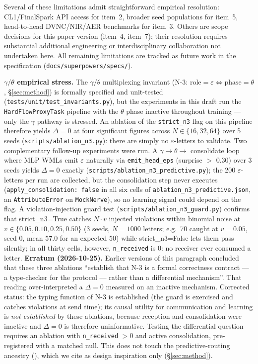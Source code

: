 \documentclass[10pt,twocolumn]{article}
\begin{document}
Several of these limitations admit straightforward empirical resolution: CL1/FinalSpark API access for item~2, broader seed populations for item~5, head-to-head DVNC/NIR/AER benchmarks for item~3. Others are scope decisions for this paper version (item~4, item~7); their resolution requires substantial additional engineering or interdisciplinary collaboration not undertaken here. All remaining limitations are tracked as future work in the specification (\texttt{docs/superpowers/specs/}).

\textbf{$\gamma/\theta$ empirical stress.} The $\gamma/\theta$ multiplexing
invariant (N-3: $\text{role}{=}\varepsilon \Leftrightarrow \text{phase}{=}\theta$,
\S\ref{sec:method}) is formally specified and unit-tested
(\texttt{tests/unit/test\_invariants.py}), but the experiments in this draft
run the \texttt{HardFlowProxyTask} pipeline with the $\theta$ phase inactive
throughout training --- only the $\gamma$ pathway is stressed. An ablation
of the \texttt{strict\_n3} flag on this pipeline therefore yields
$\Delta = 0$ at four significant figures across $N \in \{16, 32, 64\}$
over 5 seeds (\texttt{scripts/ablation\_n3.py}): there are simply no
$\varepsilon$-letters to validate. Two complementary follow-up
experiments were run. A $\gamma \to \theta \to$ consolidate loop
where MLP WMLs emit $\varepsilon$ naturally via
\texttt{emit\_head\_eps} (surprise $>$ 0.30) over 3 seeds yields
$\Delta = 0$ exactly (\texttt{scripts/ablation\_n3\_predictive.py});
the 200 $\varepsilon$-letters per run are collected, but the
consolidation step never executes (\texttt{apply\_consolidation:
false} in all six cells of \texttt{ablation\_n3\_predictive.json},
an \texttt{AttributeError} on \texttt{MockNerve}), so no learning
signal could depend on the flag. A violation-injection guard test
(\texttt{scripts/ablation\_n3\_guard.py}) confirms that strict\_n3=True
catches $N \cdot v$ injected violations within binomial noise at
$v \in \{0.05, 0.10, 0.25, 0.50\}$ (3 seeds, $N{=}1000$ letters;
e.g.\ 70 caught at $v = 0.05$, seed 0, mean 57.0 for an expected
50) while strict\_n3=False lets them pass silently; in all thirty
cells, however, \texttt{n\_received} is 0: no receiver ever consumed
a letter. \textbf{Erratum (2026-10-25).} Earlier versions of this
paragraph concluded that these three ablations ``establish that N-3
is a formal correctness contract --- a type-checker for the protocol
--- rather than a differential mechanism''. That reading
over-interpreted a $\Delta = 0$ measured on an inactive mechanism.
Corrected status: the typing function of N-3 is established (the
guard is exercised and catches violations at send time); its causal
utility for communication and learning is \emph{not established} by
these ablations, because reception and consolidation were inactive
and $\Delta = 0$ is therefore uninformative. Testing the differential
question requires an ablation with \texttt{n\_received} $> 0$ and
active consolidation, pre-registered with a matched null. This does
not touch the predictive-routing ancestry
(\cite{bastos2012canonical, bastos2020routing, gabhart2025predictive}),
which we cite as design inspiration only (\S\ref{sec:method}).
\end{document}
